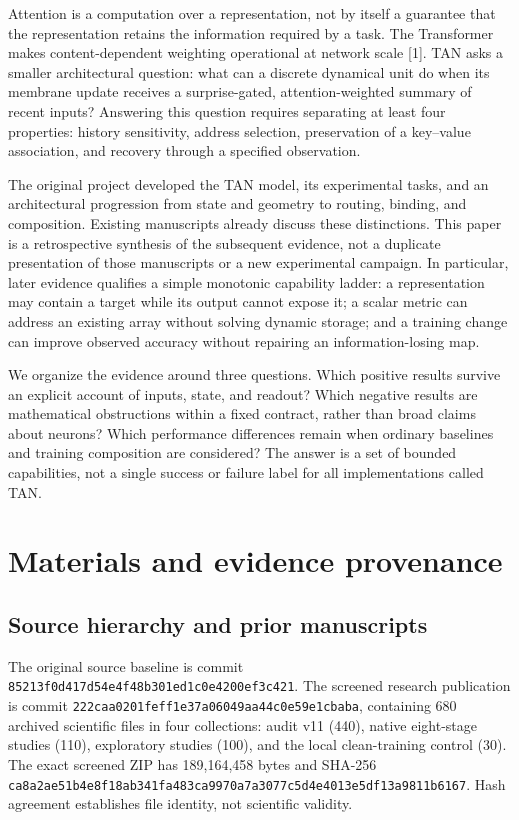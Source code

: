 \documentclass[
  10pt,
]{article}
\begin{document}
Attention is a computation over a representation, not by itself a
guarantee that the representation retains the information required by a
task. The Transformer makes content-dependent weighting operational at
network scale {[}1{]}. TAN asks a smaller architectural question: what
can a discrete dynamical unit do when its membrane update receives a
surprise-gated, attention-weighted summary of recent inputs? Answering
this question requires separating at least four properties: history
sensitivity, address selection, preservation of a key--value
association, and recovery through a specified observation.

The original project developed the TAN model, its experimental tasks,
and an architectural progression from state and geometry to routing,
binding, and composition. Existing manuscripts already discuss these
distinctions. This paper is a retrospective synthesis of the subsequent
evidence, not a duplicate presentation of those manuscripts or a new
experimental campaign. In particular, later evidence qualifies a simple
monotonic capability ladder: a representation may contain a target while
its output cannot expose it; a scalar metric can address an existing
array without solving dynamic storage; and a training change can improve
observed accuracy without repairing an information-losing map.

We organize the evidence around three questions. Which positive results
survive an explicit account of inputs, state, and readout? Which
negative results are mathematical obstructions within a fixed contract,
rather than broad claims about neurons? Which performance differences
remain when ordinary baselines and training composition are considered?
The answer is a set of bounded capabilities, not a single success or
failure label for all implementations called TAN.

\section{Materials and evidence
provenance}\label{materials-and-evidence-provenance}

\subsection{Source hierarchy and prior
manuscripts}\label{source-hierarchy-and-prior-manuscripts}

The original source baseline is commit
\texttt{85213f0d417d54e4f48b301ed1c0e4200ef3c421}. The screened research
publication is commit \texttt{222caa0201feff1e37a06049aa44c0e59e1cbaba},
containing 680 archived scientific files in four collections: audit v11
(440), native eight-stage studies (110), exploratory studies (100), and
the local clean-training control (30). The exact screened ZIP has
189,164,458 bytes and SHA-256
\texttt{ca8a2ae51b4e8f18ab341fa483ca9970a7a3077c5d4e4013e5df13a9811b6167}.
Hash agreement establishes file identity, not scientific validity.
\end{document}
